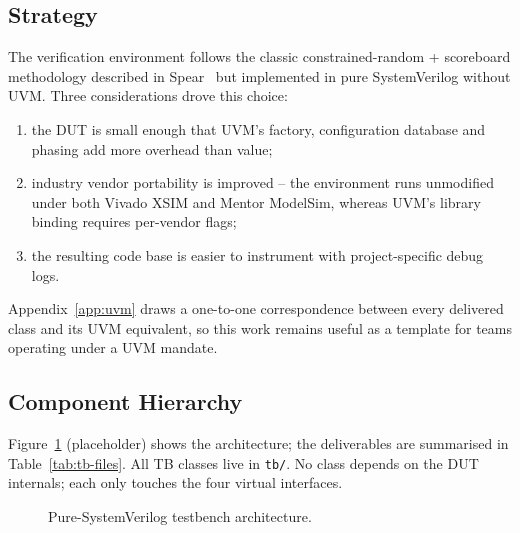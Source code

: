 \documentclass[conference,10pt,a4paper]{IEEEtran}
\begin{document}
\subsection{Strategy}
The verification environment follows the classic constrained-random
+ scoreboard methodology described in Spear~\cite{spear} but implemented
in pure SystemVerilog without UVM.  Three considerations drove this
choice:
\begin{enumerate}[leftmargin=*]
  \item the DUT is small enough that UVM's factory, configuration
        database and phasing add more overhead than value;
  \item industry vendor portability is improved -- the environment runs
        unmodified under both Vivado XSIM and Mentor ModelSim,
        whereas UVM's library binding requires per-vendor flags;
  \item the resulting code base is easier to instrument with
        project-specific debug logs.
\end{enumerate}
Appendix~\ref{app:uvm} draws a one-to-one correspondence between every
delivered class and its UVM equivalent, so this work remains useful as a
template for teams operating under a UVM mandate.

\subsection{Component Hierarchy}
Figure~\ref{fig:tb-arch} (placeholder) shows the architecture; the
deliverables are summarised in Table~\ref{tab:tb-files}.  All TB classes
live in \texttt{tb/}.  No class depends on the DUT internals; each only
touches the four virtual interfaces.

\begin{figure}[t]
  \centering
  \caption{Pure-SystemVerilog testbench architecture.}
  \label{fig:tb-arch}
\end{figure}
\end{document}
